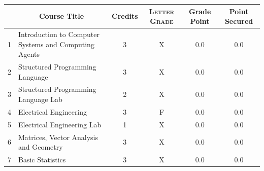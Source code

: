 \documentclass[11pt]{article}
\newcommand*{\numtwo}[1]{\pgfmathprintnumber[
                    fixed, precision=2, fixed zerofill=true]{#1}}
\begin{document}
                \begin{center}
                    \renewcommand{\arraystretch}{1.08}
                    
                \begin{tabular}{|c|l|c|>{\scshape}c|c|c|}
                \hline  \rule[-1ex]{0pt}{3.5ex} {\centering{\bf Course Code}} &  \multicolumn{1}{c|}{\textbf{Course Title}}  & {\bf Credits} & {\bf Letter Grade} & {\bf Grade Point} & {\bf Point Secured}  \\ 
                \hline   1 &  Introduction to Computer Systems and Computing Agents		 & 3 & X & 0.0 & 0.0 \\ %
                \hline   2 &  Structured Programming Language		 & 3 & X & 0.0 & 0.0 \\ %
                \hline   3 &  Structured Programming Language Lab		 & 2 & X & 0.0 & 0.0 \\ %
                \hline   4 &  Electrical Engineering		 & 3 & F & 0.0 & 0.0 \\ %
                \hline   5 &  Electrical Engineering Lab		 & 1 & X & 0.0 & 0.0 \\ %
                \hline   6 &  Matrices, Vector Analysis and Geometry		 & 3 & X & 0.0 & 0.0 \\ %
                \hline   7 &  Basic Statistics		 & 3 & X & 0.0 & 0.0 \\ %

\hline                %
                \end{tabular}
                \end{center}
                \renewcommand{\arraystretch}{1.03}
\end{document}
